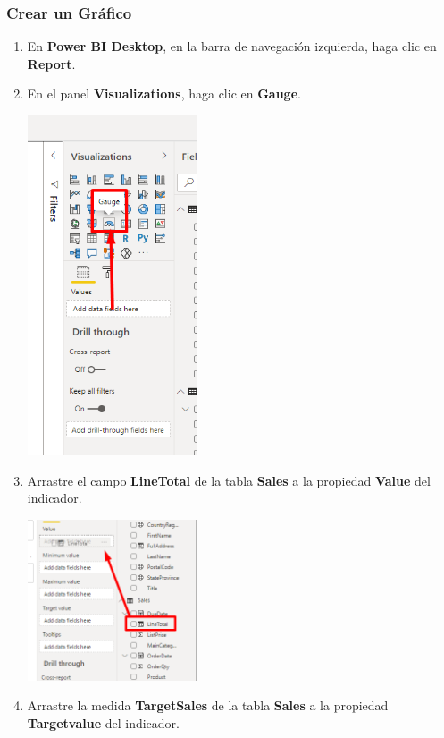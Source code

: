 \documentclass[12pt,letterpaper]{article}
\newcommand\tab[1][1cm]{\hspace*{#1}}
\begin{document}
    \subsubsection{Crear un Gráfico}
    \begin{enumerate}[\tab 1.]
        \item En \textbf{Power BI Desktop}, en la barra de navegación izquierda, haga clic en \textbf{Report}.
        \item En el panel \textbf{Visualizations}, haga clic en \textbf{Gauge}.
        \begin{center}
            \includegraphics[width=5cm]{./img/img78.png}
        \end{center}
        \item Arrastre el campo \textbf{LineTotal} de la tabla \textbf{Sales} a la propiedad \textbf{Value} del indicador.
        \begin{center}
            \includegraphics[width=5cm]{./img/img79.png}
        \end{center}
        \item Arrastre la medida \textbf{TargetSales} de la tabla \textbf{Sales} a la propiedad \textbf{Targetvalue} del indicador.

\end{enumerate}
\end{document}
